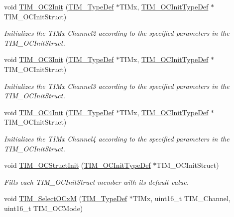 \begin{DoxyCompactItemize}
void \hyperlink{group___t_i_m_ga2017455121d910d6ff63ac6f219842c5}{T\+I\+M\+\_\+\+O\+C2\+Init} (\hyperlink{struct_t_i_m___type_def}{T\+I\+M\+\_\+\+Type\+Def} $\ast$T\+I\+Mx, \hyperlink{struct_t_i_m___o_c_init_type_def}{T\+I\+M\+\_\+\+O\+C\+Init\+Type\+Def} $\ast$T\+I\+M\+\_\+\+O\+C\+Init\+Struct)
\begin{DoxyCompactList}\small\item\em Initializes the T\+I\+Mx Channel2 according to the specified parameters in the T\+I\+M\+\_\+\+O\+C\+Init\+Struct. \end{DoxyCompactList}\item 
void \hyperlink{group___t_i_m_ga90d4a358d4e6d4c5ed17dc1d6beb5f30}{T\+I\+M\+\_\+\+O\+C3\+Init} (\hyperlink{struct_t_i_m___type_def}{T\+I\+M\+\_\+\+Type\+Def} $\ast$T\+I\+Mx, \hyperlink{struct_t_i_m___o_c_init_type_def}{T\+I\+M\+\_\+\+O\+C\+Init\+Type\+Def} $\ast$T\+I\+M\+\_\+\+O\+C\+Init\+Struct)
\begin{DoxyCompactList}\small\item\em Initializes the T\+I\+Mx Channel3 according to the specified parameters in the T\+I\+M\+\_\+\+O\+C\+Init\+Struct. \end{DoxyCompactList}\item 
void \hyperlink{group___t_i_m_ga64571ebbb58cac39a9e760050175f11c}{T\+I\+M\+\_\+\+O\+C4\+Init} (\hyperlink{struct_t_i_m___type_def}{T\+I\+M\+\_\+\+Type\+Def} $\ast$T\+I\+Mx, \hyperlink{struct_t_i_m___o_c_init_type_def}{T\+I\+M\+\_\+\+O\+C\+Init\+Type\+Def} $\ast$T\+I\+M\+\_\+\+O\+C\+Init\+Struct)
\begin{DoxyCompactList}\small\item\em Initializes the T\+I\+Mx Channel4 according to the specified parameters in the T\+I\+M\+\_\+\+O\+C\+Init\+Struct. \end{DoxyCompactList}\item 
void \hyperlink{group___t_i_m_ga394683c78ae02837882e36014e11643e}{T\+I\+M\+\_\+\+O\+C\+Struct\+Init} (\hyperlink{struct_t_i_m___o_c_init_type_def}{T\+I\+M\+\_\+\+O\+C\+Init\+Type\+Def} $\ast$T\+I\+M\+\_\+\+O\+C\+Init\+Struct)
\begin{DoxyCompactList}\small\item\em Fills each T\+I\+M\+\_\+\+O\+C\+Init\+Struct member with its default value. \end{DoxyCompactList}\item 
void \hyperlink{group___t_i_m_ga83ea0af5a7c1af521236ce5e4d2c42b0}{T\+I\+M\+\_\+\+Select\+O\+CxM} (\hyperlink{struct_t_i_m___type_def}{T\+I\+M\+\_\+\+Type\+Def} $\ast$T\+I\+Mx, uint16\+\_\+t T\+I\+M\+\_\+\+Channel, uint16\+\_\+t T\+I\+M\+\_\+\+O\+C\+Mode)

\end{DoxyCompactItemize}
